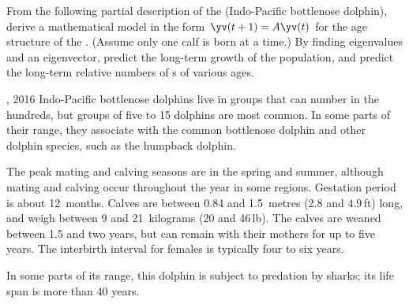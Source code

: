 \begin{exercise}  
From the following partial description of the  (Indo-Pacific bottlenose dolphin), 
derive a mathematical model in the form \(\yv(t+1)=A\yv(t)\) for the age structure of the .
(Assume only one calf is born at a time.)
By finding eigenvalues and an eigenvector, predict the long-term growth of the population, and predict the long-term relative numbers of s of various ages.
\begin{quoted}{, 2016}
Indo-Pacific bottlenose dolphins live in groups that can number in the hundreds, but groups of five to 15 dolphins are most common.  In some parts of their range, they associate with the common bottlenose dolphin and other dolphin species, such as the humpback dolphin.

The peak mating and calving seasons are in the spring and summer, although mating and calving occur throughout the year in some regions. Gestation period is about 12~months. Calves are between 0.84 and 1.5~metres (2.8 and 4.9\,ft) long, and weigh between 9 and 21~kilograms (20 and 46\,lb). The calves are weaned between 1.5 and two years, but can remain with their mothers for up to five years. The interbirth interval for females is typically four to six years.

In some parts of its range, this dolphin is subject to predation by sharks; its life span is more than 40 years.
\end{quoted}
\end{exercise}






